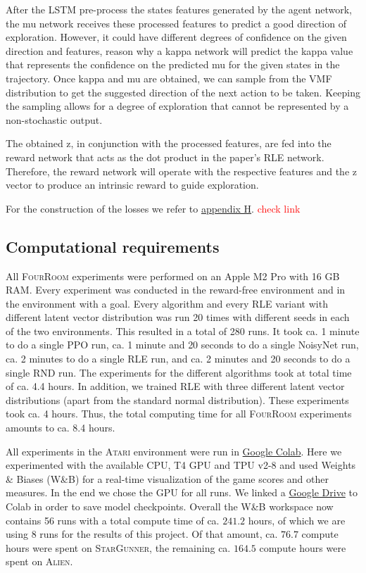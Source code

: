 \documentclass[10pt]{article} %
\begin{document}
After the LSTM pre-process the states features generated by the agent network, the mu network receives these processed features to predict a good direction of exploration. However, it could have different degrees of confidence on the given direction and features, reason why a kappa network will predict the kappa value that represents the confidence on the predicted mu for the given states in the trajectory. Once kappa and mu are obtained, we can sample from the VMF distribution to get the suggested direction of the next action to be taken. Keeping the sampling allows for a degree of exploration that cannot be represented by a non-stochastic output. 

The obtained z, in conjunction with the processed features, are fed into the reward network that acts as the dot product in the paper's RLE network. Therefore, the reward network will operate with the respective features and the z vector to produce an intrinsic reward to guide exploration.

For the construction of the losses we refer to \hyperlink{na-vmf}{appendix H}. \textcolor{red}{check link}

\hypertarget{computational-requirements}{\subsection{Computational requirements}}

\noindent All \textsc{FourRoom} experiments were performed on an Apple M2 Pro with 16 GB RAM. Every experiment was conducted in the reward-free environment and in the environment with a goal. Every algorithm and every RLE variant with different latent vector distribution was run 20 times with different seeds in each of the two environments. This resulted in a total of 280 runs. It took ca. 1 minute to do a single PPO run, ca. 1 minute and 20 seconds to do a single NoisyNet run, ca. 2 minutes to do a single RLE run, and ca. 2 minutes and 20 seconds to do a single RND run. The experiments for the different algorithms took at total time of ca. 4.4 hours. In addition, we trained RLE with three different latent vector distributions (apart from the standard normal distribution). These experiments took ca. 4 hours. Thus, the total computing time for all \textsc{FourRoom} experiments amounts to ca. 8.4 hours.

\noindent All experiments in the \textsc{Atari} environment were run in \href{https://colab.research.google.com/}{Google Colab}. Here we experimented with the available CPU, T4 GPU and TPU v2-8 and used Weights \& Biases (W\&B) for a real-time visualization of the game scores and other measures. In the end we chose the GPU for all runs. We linked a \href{https://drive.google.com}{Google Drive} to Colab in order to save model checkpoints. Overall the W\&B workspace now contains 56 runs with a total compute time of ca. $241.2$ hours, of which we are using 8 runs for the results of this project. Of that amount, ca. $76.7$ compute hours were spent on \textsc{StarGunner}, the remaining ca. $164.5$ compute hours were spent on \textsc{Alien}.
\end{document}
